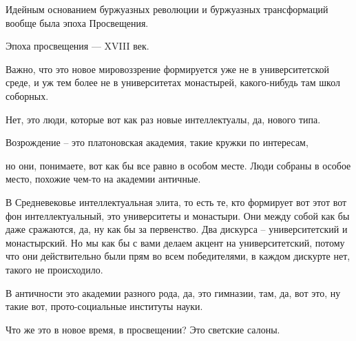 

Идейным основанием буржуазных революции и буржуазных трансформаций вообще была эпоха Просвещения. 



Эпоха просвещения — XVIII век. 

Важно, что это новое
мировоззрение формируется уже не в университетской среде, и уж тем более не в
университетах монастырей, какого-нибудь там школ соборных. 

Нет, это люди, которые вот как раз новые интеллектуалы, да, нового типа. 


Возрождение – это платоновская академия, такие кружки
по интересам, 

но они, понимаете, вот как бы все равно в особом месте. Люди
собраны в особое место, похожие чем-то на академии античные. 

В Средневековье
интеллектуальная элита, то есть те, кто формирует вот этот вот фон
интеллектуальный, это университеты и монастыри. Они между собой как бы даже
сражаются, да, ну как бы за первенство. Два дискурса – университетский и
монастырский. Но мы как бы с вами делаем акцент на университетский, потому что
они действительно были прям во всем победителями, в каждом дискурте нет, такого
не происходило. 


В
античности это академии разного рода, да, это гимназии, там, да, вот это, ну
такие вот, прото-социальные институты науки. 

Что же это в новое время, в
просвещении? Это светские салоны. 


